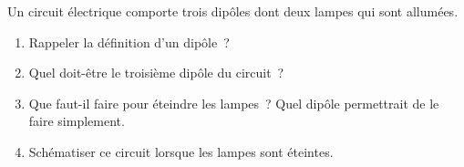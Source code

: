 Un circuit électrique comporte trois dipôles dont deux lampes qui sont allumées.
\begin{enumerate}
    \item Rappeler la définition d'un dipôle~?
    \item Quel doit-être le troisième dipôle du circuit~?
    \item Que faut-il faire pour éteindre les lampes~? Quel dipôle permettrait
          de le faire simplement.
    \item Schématiser ce circuit lorsque les lampes sont éteintes.
\end{enumerate}


